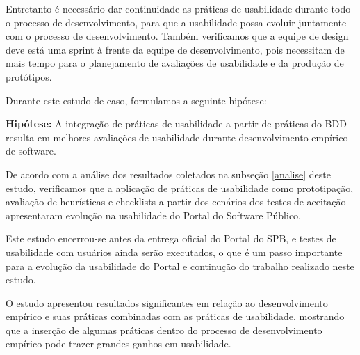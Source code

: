 Entretanto é necessário dar continuidade as práticas de usabilidade durante todo o processo de desenvolvimento, para que a usabilidade possa evoluir juntamente com o processo de desenvolvimento. Também verificamos que a equipe de design deve está uma sprint à frente da equipe de desenvolvimento, pois necessitam de mais tempo para o planejamento de avaliações de usabilidade e da produção de protótipos.




Durante este estudo de caso, formulamos a seguinte hipótese:

\textbf{Hipótese: } A integração de práticas de usabilidade a partir de práticas do BDD resulta em melhores avaliações de usabilidade durante desenvolvimento empírico de software.

De acordo com a análise dos resultados coletados na subseção \ref{analise} deste estudo, verificamos que a aplicação de práticas de usabilidade como prototipação, avaliação de heurísticas e checklists a partir dos cenários dos testes de aceitação apresentaram evolução na usabilidade do Portal do Software Público.

Este estudo encerrou-se antes da entrega oficial do Portal do SPB, e testes de usabilidade com usuários ainda serão executados, o que é um passo importante para a evolução da usabilidade do Portal e continução do trabalho realizado neste estudo.

O estudo apresentou resultados significantes em relação ao desenvolvimento empírico	e suas práticas combinadas com as práticas de usabilidade, mostrando que a inserção de algumas práticas dentro do processo de desenvolvimento empírico pode trazer grandes ganhos em usabilidade.

